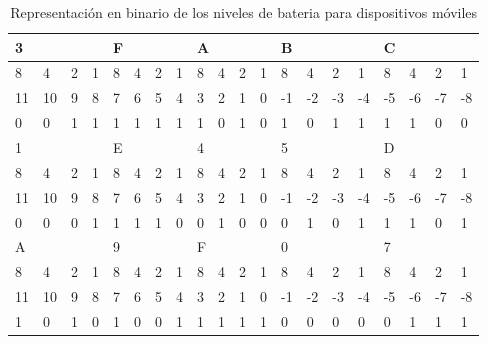 \documentclass[stu, 12pt, letterpaper, donotrepeattitle, floatsintext, natbib]{apa7}
\begin{document}
\begin{table}[]
\caption{Representación en binario de los niveles de bateria para dispositivos móviles}
\begin{tabular}{|l|l|l|l|l|l|l|l|l|l|l|l|l|l|l|l|l|l|l|l|}
\hline
\multicolumn{4}{|l|}{3}   & \multicolumn{4}{l|}{F} & \multicolumn{4}{|l}{A} & \multicolumn{4}{|l}{B}       & \multicolumn{4}{|l|}{C}               \\ \hline
8    & 4    & 2   & 1   & 8    & 4   & 2   & 1  & 8   & 4   & 2   & 1   & 8   & 4    & 2     & 1      & 8       & 4        & 2         & 1         \\ \hline
11   & 10   & 9   & 8   & 7    & 6   & 5   & 4  & 3   & 2   & 1   & 0   & -1  & -2   & -3    & -4     & -5      & -6       & -7        & -8        \\ \hline
0    & 0    & 1   & 1   & 1    & 1   & 1   & 1  & 1   & 0   & 1   & 0   & 1   & 0    & 1     & 1      & 1       & 1        & 0         & 0         \\ \hline
\multicolumn{4}{|l|}{1}   & \multicolumn{4}{l|}{E} & \multicolumn{4}{|l}{4} & \multicolumn{4}{|l}{5}       & \multicolumn{4}{|l|}{D}               \\ \hline
8    & 4    & 2   & 1   & 8    & 4   & 2   & 1  & 8   & 4   & 2   & 1   & 8   & 4    & 2     & 1      & 8       & 4        & 2         & 1         \\ \hline
11   & 10   & 9   & 8   & 7    & 6   & 5   & 4  & 3   & 2   & 1   & 0   & -1  & -2   & -3    & -4     & -5      & -6       & -7        & -8        \\ \hline
0    & 0    & 0   & 1   & 1    & 1   & 1   & 0  & 0   & 1   & 0   & 0   & 0   & 1    & 0     & 1      & 1       & 1        & 0         & 1         \\ \hline
\multicolumn{4}{|l|}{A}   & \multicolumn{4}{l|}{9} & \multicolumn{4}{|l}{F} & \multicolumn{4}{|l}{0}       & \multicolumn{4}{|l|}{7}               \\ \hline
8    & 4    & 2   & 1   & 8    & 4   & 2   & 1  & 8   & 4   & 2   & 1   & 8   & 4    & 2     & 1      & 8       & 4        & 2         & 1         \\ \hline
11   & 10   & 9   & 8   & 7    & 6   & 5   & 4  & 3   & 2   & 1   & 0   & -1  & -2   & -3    & -4     & -5      & -6       & -7        & -8        \\ \hline
1    & 0    & 1   & 0   & 1    & 0   & 0   & 1  & 1   & 1   & 1   & 1   & 0   & 0    & 0     & 0      & 0       & 1        & 1         & 1         \\ \hline    
\end{tabular}
\end{table}
\end{document}

